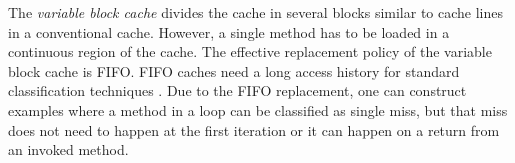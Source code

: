 %
%
%


%
%

The \emph{variable block cache} divides the cache in several blocks
similar to cache lines in a conventional cache. However, a single
method has to be loaded in a continuous region of the cache. The
effective replacement policy of the variable block cache is FIFO.
FIFO caches need a long access history for standard classification
techniques \cite{Reineke:RTS2007}. Due to the FIFO replacement, one
can construct examples where a method in a loop can be classified as
single miss, but that miss does not need to happen at the first
iteration or it can happen on a return from an invoked method.



